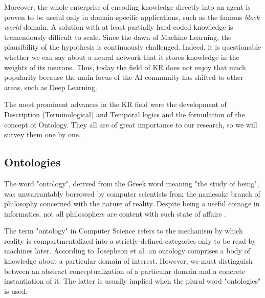 Moreover, the whole enterprise of encoding knowledge directly into an agent is proven to be useful only in domain-specific
applications, such as the famous \textit{block world} \cite{shrdlu} domain. A solution with at least partially hard-coded
knowledge is tremendously difficult to scale. Since the dawn of Machine Learning, the plausibility of the hypothesis is
continuously challenged. Indeed, it is questionable whether we can say about a neural network that it stores knowledge in the
weights of its neurons. Thus, today the field of KR does not enjoy that much popularity because the main focus of the AI community
has shifted to other areas, such as Deep Learning.

The most prominent advances in the KR field were the development of Description (Terminological) and Temporal logics and the
formulation of the concept of Ontology. They all are of great importance to our research, so we will survey them one by one.

\subsection{Ontologies}
The word "ontology", derived from the Greek word meaning "the study of being", was unwarrantably borrowed by computer scientists
from the namesake branch of philosophy concerned with the nature of reality. Despite being a useful coinage in
informatics, not all philosophers are content with such state of affairs \cite{confusion}.

The term "ontology" in Computer Science refers to the mechanism by which reality is compartmentalized into a strictly-defined
categories only to be read by machines later. According to Josephson et al. \cite{ontowhy} an ontology comprises a body of
knowledge about a particular domain of interest. However, we must distinguish between an abstract conceptualization of a
particular domain and a concrete instantiation of it. The latter is usually implied when the plural word "ontologies" is used.

